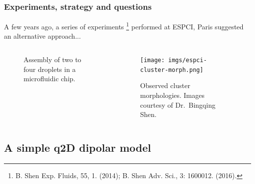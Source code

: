\begin{frame}
  \frametitle{Experiments, strategy and questions}

  A few years ago, a series of experiments%
  \footnote{B. Shen \etal Exp. Fluids, 55, 1. (2014); B. Shen \etal Adv. Sci., 3: 1600012. (2016).}
  performed at ESPCI, Paris suggested an alternative approach...
  \bigskip
  \begin{columns}[T]
    
    \begin{column}{0.52\textwidth}
      \begin{figure}
        \centering 
        \caption{Assembly of two to four droplets in a microfluidic chip.}
      \end{figure}
    \end{column}

    \pause
    \begin{column}{0.4\textwidth}
      \begin{figure}
        \centering 
        \texttt{[image: imgs/espci-cluster-morph.png]}
        \caption{Observed cluster morphologies.
        Images courtesy of Dr.\ Bingqing Shen.}
      \end{figure}
    \end{column}

  \end{columns}
  
  \pause
   \vskip0.1cm
  \pause
  
\end{frame}

\hypertarget{dipolar}{%
  \subsection{A simple q2D dipolar model}}

